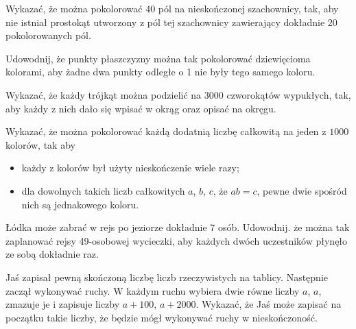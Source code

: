 \begin{problem}{1} 
	Wykazać, że można pokolorować $40$ pól na nieskończonej szachownicy, tak, aby nie istniał prostokąt utworzony z pól tej szachownicy zawierający dokładnie $20$ pokolorowanych pól.
\end{problem}

\begin{problem}{2} 
	Udowodnij, że punkty płaszczyzny można tak pokolorować dziewięcioma kolorami, aby żadne dwa punkty odległe o 1 nie były tego samego koloru.
\end{problem}

\begin{problem}{3}
	Wykazać, że każdy trójkąt można podzielić na $3000$ czworokątów wypukłych, tak, aby każdy z nich dało się wpisać w okrąg oraz opisać na okręgu.
\end{problem}

\begin{problem}{4} 
	Wykazać, że można pokolorować każdą dodatnią liczbę całkowitą na jeden z $1000$ kolorów, tak aby
	\begin{itemize}
		\item każdy z kolorów był użyty nieskończenie wiele razy;
		\item dla dowolnych takich liczb całkowitych $a$, $b$, $c$, że $ab = c$, pewne dwie spośród nich są jednakowego koloru.
	\end{itemize} 
\end{problem}

\begin{problem}{5}
	Łódka może zabrać w rejs po jeziorze dokładnie 7 osób. Udowodnij. że można tak zaplanować rejsy 49-osobowej wycieczki, aby każdych dwóch uczestników płynęło ze sobą dokładnie raz.
\end{problem}

\begin{problem}{6}
	Jaś zapisał pewną skończoną liczbę liczb rzeczywistych na tablicy. Następnie zaczął wykonywać ruchy. W każdym ruchu wybiera dwie równe liczby $a$, $a$, zmazuje je i zapisuje liczby $a + 100$, $a + 2000$. Wykazać, że Jaś może zapisać na początku takie liczby, że będzie mógł wykonywać ruchy w nieskończoność.
\end{problem}


